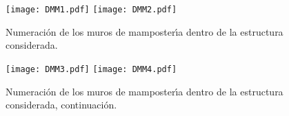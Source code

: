 \begin{figure} [htbp]
	\centering
\texttt{[image: DMM1.pdf]}
\texttt{[image: DMM2.pdf]}
\caption{Numeraci\'on de los muros de mamposter\'{\i}a dentro de la estructura considerada.}
\label{fig:apendis24}
\end{figure}

\begin{figure} [htbp]
	\centering
\texttt{[image: DMM3.pdf]}
\texttt{[image: DMM4.pdf]}
\caption{Numeraci\'on de los muros de mamposter\'{\i}a dentro de la estructura considerada, continuaci\'on.}
\label{fig:apendis25}
\end{figure}

\newpage

